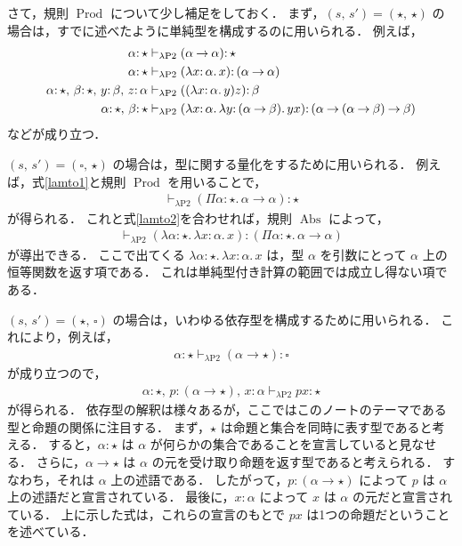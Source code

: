 \documentclass[./main]{subfiles}
\newcommand{\lam}{\lambda}
\newcommand{\bto}{\mathbin{\to}}
\newcommand{\ocl}{\mathord{:}}
\newcommand{\op}[1]{\mathop{\mathrm{#1}}\nolimits}
\newcommand{\typstar}{\mathord{\star}}
\newcommand{\typsq}{\mathord{\square}}
\newcommand{\ats}{\,}
\theoremstyle{definition}
\begin{document}
さて，規則 $ \op{Prod} $ について少し補足をしておく．
まず，$ (s,\ats s') = (\typstar,\ats \typstar) $ の場合は，すでに述べたように単純型を構成するのに用いられる．
例えば，
\begin{align}
\alpha \ocl\, \typstar & \vdash _{\lam \mathrm{P2}} (\alpha \bto \alpha) \ocl\, \typstar \label{lamto1} \\
\alpha \ocl\, \typstar & \vdash _{\lam \mathrm{P2}} (\lam x \ocl\, \alpha.\, x) \ocl\, (\alpha \bto \alpha) \label{lamto2} \\
\alpha \ocl\, \typstar,\ats \beta \ocl\, \typstar,\ats y \ocl\, \beta,\ats z \ocl\, \alpha & \vdash _{\lam \mathrm{P2}} ((\lam x \ocl\, \alpha.\, y) z) \ocl\, \beta \notag \\
\alpha \ocl\, \typstar,\ats \beta \ocl\, \typstar & \vdash _{\lam \mathrm{P2}} (\lam x \ocl\, \alpha.\, \lam y \ocl\, (\alpha \bto \beta).\, yx) \ocl\, (\alpha \bto (\alpha \bto \beta) \bto \beta) \notag
\end{align}
などが成り立つ．

$ (s,\ats s') = (\typsq,\ats \typstar) $ の場合は，型に関する量化をするために用いられる．
例えば，式\ref{lamto1}と規則 $ \op{Prod} $ を用いることで，
\begin{gather*}
\vdash _{\lam \mathrm{P2}} (\Pi \alpha \ocl\, \typstar.\, \alpha \bto \alpha) \ocl\, \typstar \label{quanttype}
\end{gather*}
が得られる．
これと式\ref{lamto2}を合わせれば，規則 $ \op{Abs} $ によって，
\begin{gather*}
\vdash _{\lam \mathrm{P2}} (\lam \alpha \ocl\, \typstar.\, \lam x \ocl\, \alpha.\, x) \ocl\, (\Pi \alpha \ocl\, \typstar.\, \alpha \bto \alpha) 
\end{gather*}
が導出できる．
ここで出てくる $ \lam \alpha \ocl\, \typstar.\, \lam x \ocl\, \alpha.\, x $ は，型 $ \alpha $ を引数にとって $ \alpha $ 上の恒等関数を返す項である．
これは単純型付き計算の範囲では成立し得ない項である．

$ (s,\ats s') = (\typstar,\ats \typsq) $ の場合は，いわゆる依存型を構成するために用いられる． 
これにより，例えば，
\begin{gather*}
\alpha \ocl\, \typstar \vdash _{\lam \mathrm{P2}} (\alpha \bto \typstar) \ocl\, \typsq
\end{gather*}
が成り立つので，
\begin{gather*}
\alpha \ocl\, \typstar,\ats p \ocl\, (\alpha \bto \typstar),\ats x \ocl\, \alpha \vdash _{\lam \mathrm{P2}} px \ocl\, \typstar
\end{gather*}
が得られる．
依存型の解釈は様々あるが，ここではこのノートのテーマである型と命題の関係に注目する．
まず，$ \typstar $ は命題と集合を同時に表す型であると考える．
すると，$ \alpha \ocl\, \typstar $ は $ \alpha $ が何らかの集合であることを宣言していると見なせる．
さらに，$ \alpha \bto \typstar $ は $ \alpha $ の元を受け取り命題を返す型であると考えられる．
すなわち，それは $ \alpha $ 上の述語である．
したがって，$ p \ocl\, (\alpha \bto \typstar) $ によって $ p  $ は $ \alpha $ 上の述語だと宣言されている．
最後に，$ x \ocl\, \alpha $ によって $ x $ は $ \alpha $ の元だと宣言されている．
上に示した式は，これらの宣言のもとで $ px $ は1つの命題だということを述べている．
\end{document}
